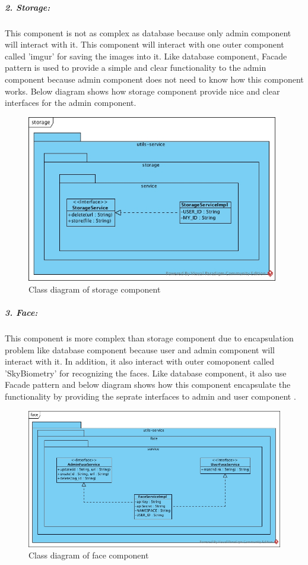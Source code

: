 \documentclass[a4paper,11pt]{article}
\begin{document}
\newpage
\subparagraph{2. Storage: }This component is not as complex as database because only admin component will interact with it. This component will interact with one outer component called 'imgur' for saving the images into it. Like database component, Facade pattern is used to provide a simple and clear functionality to the admin component because admin component does not need to know how this component works. Below diagram shows how storage component provide nice and clear interfaces for the admin component.

\begin{figure}[ht!]
    \centering
	\includegraphics[width=110mm]{ClassDiagrams/new/storage.jpg}
	\caption{Class diagram of storage component}
\end{figure}

\subparagraph{3. Face: }This component is more complex than storage component due to encapsulation problem like database component because user and admin component will interact with it. In addition, it also interact with outer comoponent called 'SkyBiometry' for recognizing the faces. Like database component, it also use Facade pattern and below diagram shows how this component encapsulate the functionality by providing the seprate interfaces to admin and user component .

\begin{figure}[ht!]
    \centering
	\includegraphics[width=125mm]{ClassDiagrams/new/face.jpg}
	\caption{Class diagram of face component}
\end{figure}
\end{document}
